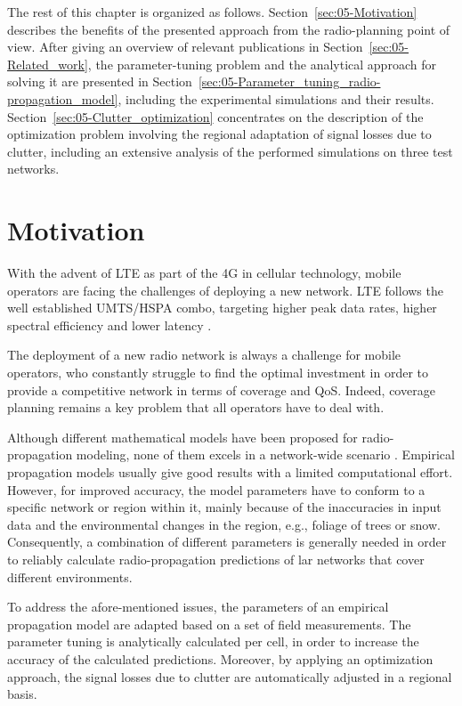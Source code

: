 The rest of this chapter is organized as follows. Section~\ref{sec:05-Motivation}
describes the benefits of the presented approach from the radio-planning
point of view. After giving an overview of relevant publications in
Section~\ref{sec:05-Related_work}, the parameter-tuning problem
and the analytical approach for solving it are presented in Section~\ref{sec:05-Parameter_tuning_radio-propagation_model},
including the experimental simulations and their results. Section~\ref{sec:05-Clutter_optimization}
concentrates on the description of the optimization problem involving
the regional adaptation of signal losses due to clutter, including
an extensive analysis of the performed simulations on three test networks.


\section{Motivation \label{sec:05-Motivation}}

With the advent of LTE as part of the 4G in cellular technology, mobile
operators are facing the challenges of deploying a new network. LTE
follows the well established UMTS/HSPA combo, targeting higher peak
data rates, higher spectral efficiency and lower latency \cite{Song_Evolved_cellular_network_planning_and_optimization_for_UMTS_and_LTE:2010}. 

The deployment of a new radio network is always a challenge for mobile
operators, who constantly struggle to find the optimal investment
in order to provide a competitive network in terms of coverage and
QoS. Indeed, coverage planning remains a key problem that all operators
have to deal with.

Although different mathematical models have been proposed for radio-propagation
modeling, none of them excels in a network-wide scenario \cite{Shabbir_Comparison_of_radio_propagation_models:2011}.
Empirical propagation models usually give good results with a limited
computational effort. However, for improved accuracy, the model parameters
have to conform to a specific network or region within it, mainly
because of the inaccuracies in input data and the environmental changes
in the region, e.g., foliage of trees or snow. Consequently, a combination
of different parameters is generally needed in order to reliably calculate
radio-propagation predictions of lar networks that cover different
environments.

To address the afore-mentioned issues, the parameters of an empirical
propagation model are adapted based on a set of field measurements.
The parameter tuning is analytically calculated per cell, in order
to increase the accuracy of the calculated predictions. Moreover,
by applying an optimization approach, the signal losses due to clutter
are automatically adjusted in a regional basis.

